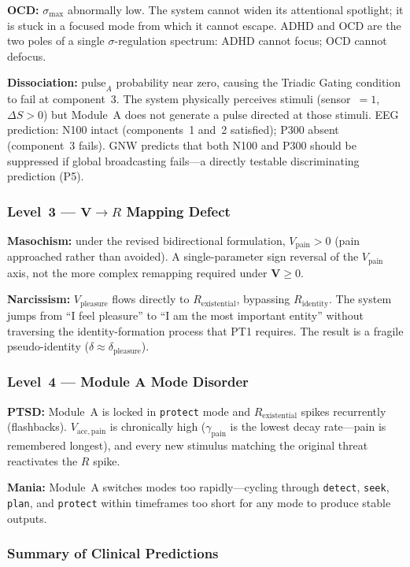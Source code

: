 \documentclass[12pt,a4paper]{article}
\newcommand{\Rid}{R_{\mathrm{identity}}}
\newcommand{\Rex}{R_{\mathrm{existential}}}
\newcommand{\vpain}{V_{\mathrm{pain}}}
\newcommand{\vpleasure}{V_{\mathrm{pleasure}}}
\begin{document}
\textbf{OCD:} $\sigma_{\max}$ abnormally low. The system cannot widen its
attentional spotlight; it is stuck in a focused mode from which it cannot
escape. ADHD and OCD are the two poles of a single $\sigma$-regulation
spectrum: ADHD cannot focus; OCD cannot defocus.

\textbf{Dissociation:} $\mathrm{pulse}_A$ probability near zero, causing the
Triadic Gating condition to fail at component~3. The system physically perceives
stimuli (sensor~$= 1$, $\Delta S > 0$) but Module~A does not generate a pulse
directed at those stimuli. EEG prediction: N100 intact (components~1 and~2
satisfied); P300 absent (component~3 fails). GNW predicts that both N100 and
P300 should be suppressed if global broadcasting fails---a directly testable
discriminating prediction (P5).

\subsubsection{Level~3 --- $\mathbf{V}\!\to\!R$ Mapping Defect}

\textbf{Masochism:} under the revised bidirectional formulation, $\vpain > 0$
(pain approached rather than avoided). A single-parameter sign reversal of the
$\vpain$ axis, not the more complex remapping required under
$\mathbf{V}\ge 0$.

\textbf{Narcissism:} $\vpleasure$ flows directly to $\Rex$, bypassing $\Rid$.
The system jumps from ``I feel pleasure'' to ``I am the most important entity''
without traversing the identity-formation process that PT1 requires. The result
is a fragile pseudo-identity ($\delta\approx\delta_{\mathrm{pleasure}}$).

\subsubsection{Level~4 --- Module A Mode Disorder}

\textbf{PTSD:} Module~A is locked in \texttt{protect} mode and $\Rex$ spikes
recurrently (flashbacks). $V_{\mathrm{acc,pain}}$ is chronically high
($\gamma_{\mathrm{pain}}$ is the lowest decay rate---pain is remembered
longest), and every new stimulus matching the original threat reactivates the
$R$ spike.

\textbf{Mania:} Module~A switches modes too rapidly---cycling through
\texttt{detect}, \texttt{seek}, \texttt{plan}, and \texttt{protect} within
timeframes too short for any mode to produce stable outputs.

\subsubsection{Summary of Clinical Predictions}
\end{document}
